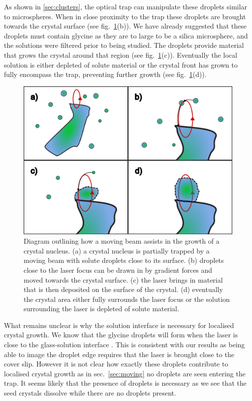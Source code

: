 As shown in \ref{sec:clusters}, the optical trap can manipulate 
these droplets similar to microspheres. When in close proximity 
to the trap these droplets are brought towards the crystal 
surface (see fig.~\ref{fig:local_nucleation}(b)). We have 
already suggested that these droplets must contain glycine as 
they are to large to be a silica microsphere, and the solutions 
were filtered prior to being studied. The droplets provide 
material that grows the crystal around that region (see fig.~\ref{fig:local_nucleation}(c)). Eventually the local 
solution is either depleted of solute material or the crystal 
front has grown to fully encompass the trap, preventing further 
growth (see fig.~\ref{fig:local_nucleation}(d)). 
\begin{figure}[h!]
	\centering
	\includegraphics[width=0.8\linewidth]{galvano_diagram.pdf}
	\caption{Diagram outlining how a moving beam assists in the 
		growth of a crystal nucleus. (a) a crystal nucleus is 
		partially trapped by a moving beam with solute droplets 
		close to its surface. (b) droplets close to the laser
		focus can be drawn in by gradient forces and moved 
		towards the crystal surface. (c) the laser brings in 
		material that is then deposited on the surface of the 
		crystal. (d) eventually the crystal area either fully 
		surrounds the laser focus or the solution surrounding 
		the laser is depleted of solute material.}
	\label{fig:local_nucleation}
\end{figure}

What remains unclear is why the solution interface is necessary
for localised crystal growth. We know that the glycine droplets 
will form when the laser is close to the glass-solution interface
\cite{Gowayed2021, Yuyama2010, Yuyama2012}. This is consistent 
with our results as being able to image the droplet edge requires 
that the laser is brought close to the cover slip. However it is 
not clear how exactly these droplets contribute to localised 
crystal growth as in sec.~\ref{sec:moving} no droplets are seen 
entering the trap. It seems likely that the presence of droplets 
is necessary as we see that the seed crystals dissolve while 
there are no droplets present. 

